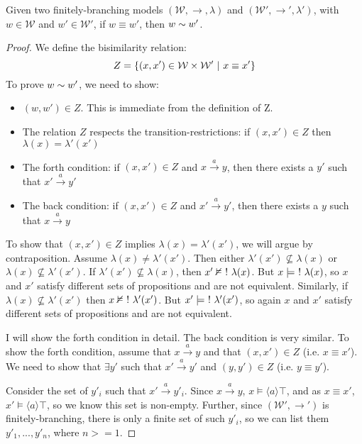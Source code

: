 \begin{case}
Given two finitely-branching models $(\mathcal{W}, \rightarrow,
\lambda)$ and $(\mathcal{W}', \rightarrow', \lambda')$, with $w \in
\mathcal{W}$ and $w' \in \mathcal{W}'$, if $w \equiv w'$, then $w
\sim w'$.
\end{case}
\begin{proof}
We define the bisimilarity relation:
\[
Z = \{(x,x') \in \mathcal{W} \times \mathcal{W}' \ | \  x \equiv x' \}
\]
To prove $w \sim w'$, we need to show:
\begin{itemize}
\item
$(w,w') \in Z$. This is immediate from the definition of Z.
\item
The relation $Z$ respects the transition-restrictions: if $(x,x') \in Z$ then $\lambda(x) = \lambda'(x')$
\item
The forth condition: if $(x,x') \in Z$ and $x \xrightarrow{a} y$, then there exists a $y'$ such that $x' \xrightarrow{a} y'$
\item
The back condition: if $(x,x') \in Z$ and $x' \xrightarrow{a} y'$, then there exists a $y$ such that $x \xrightarrow{a} y$
\end{itemize}
To show that $(x,x') \in Z$ implies $\lambda(x) = \lambda'(x')$, we will argue by contraposition.
Assume $\lambda(x) \neq \lambda'(x')$.
Then either $\lambda'(x') \nsubseteq  \lambda(x)$ or $\lambda(x) \nsubseteq  \lambda'(x')$.
If $\lambda'(x') \nsubseteq  \lambda(x)$, then $x' \nvDash \ ! \  \lambda(x)$.
But $x \models \ ! \  \lambda(x)$, so $x$ and $x'$ satisfy different sets of propositions and are not equivalent.
Similarly, if $\lambda(x) \nsubseteq  \lambda'(x')$ then $x \nvDash \ ! \  \lambda'(x')$.
But $x' \models \ ! \  \lambda'(x')$, so again $x$ and $x'$ satisfy different sets of propositions and are not equivalent.

I will show the forth condition in detail. The back condition is very similar.
To show the forth condition, assume that  $x \xrightarrow{a} y$ and that $(x,x') \in Z$ (i.e. $x \equiv x'$).
We need to show that $\exists y'$ such that $x' \xrightarrow{a} y'$ and $(y,y') \in Z$ (i.e. $y \equiv y'$).

Consider the set of $y'_i$ such that $x' \xrightarrow{a} y'_i$. Since $x \xrightarrow{a} y$, $x \models \langle a \rangle \top$, and as $x \equiv x'$,  $x' \models \langle a \rangle \top$, so we know this set is non-empty.
Further, since $(\mathcal{W}', \rightarrow')$ is finitely-branching, there is only a finite set of such $y'_i$, so we can list them $y'_1, ..., y'_n$,  where $n >= 1$.


\end{proof}
